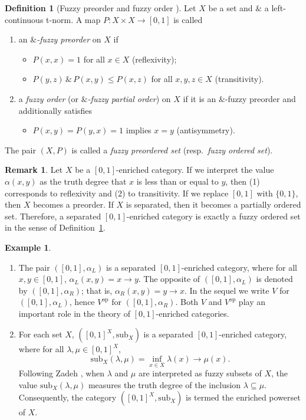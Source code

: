 \documentclass[preprint,3p,times]{elsarticle}
\theoremstyle{plain}
\theoremstyle{definition}
\newtheorem{definition}[thm]{Definition}
\newtheorem{exmp}[thm]{Example}
\newtheorem{remark}[thm]{Remark}
\numberwithin{equation}{section}
\begin{document}
\begin{definition}[Fuzzy preorder and fuzzy order \cite{HL2006}]\label{def:fuzzy-order}
Let $X$ be a set and $\&$ a left-continuous t-norm. A map $P \colon X \times X \to [0,1]$ is called
\begin{enumerate}[label=(\arabic*)]
    \item an \emph{$\&$-fuzzy preorder} on $X$ if
        \begin{itemize}
            \item[(i)] $P(x,x) = 1$ for all $x \in X$ \hfill (reflexivity);
            \item[(ii)] $P(y,z) \,\&\, P(x,y) \leq P(x,z)$ for all $x,y,z \in X$ \hfill (transitivity).
        \end{itemize}
    \item a \emph{fuzzy order} (or \emph{$\&$-fuzzy partial order}) on $X$ if it is an $\&$-fuzzy preorder 
        and additionally satisfies
        \begin{itemize}
            \item[(iii)] $P(x,y) = P(y,x) = 1$ implies $x = y$ \hfill (antisymmetry).
        \end{itemize}
\end{enumerate}
The pair $(X,P)$ is called a \emph{fuzzy preordered set} (resp.\ \emph{fuzzy ordered set}).
\end{definition}
\begin{remark}
Let \(X\) be a \([0,1]\)-enriched category. If we interpret the value \(\alpha(x,y)\) as the truth degree that \(x\) is less than or equal to \(y\), then (1) corresponds to reflexivity and (2) to transitivity. If we replace \([0,1]\) with \(\{0,1\}\), then \(X\) becomes a preorder. If \(X\) is separated, then it becomes a partially ordered set. Therefore, a separated \([0,1]\)-enriched category is exactly a fuzzy ordered set in the sense of Definition~\ref{def:fuzzy-order}.
\end{remark}
\begin{exmp}
\begin{enumerate} [label={\rm(\arabic*)}]
    \item The pair $([0,1], \alpha_L)$ is a separated \([0,1]\)-enriched category, where for all $x, y \in [0,1]$,
$\alpha_L(x, y) = x \to y$. The opposite of $([0,1], \alpha_L)$ is denoted by $([0,1], \alpha_R)$; that is, $\alpha_R(x, y) = y \to x$. In the sequel we write $V$ for $([0,1], \alpha_L)$, hence $V^\mathrm{op}$ for $([0,1], \alpha_R)$. Both $V$ and $V^\mathrm{op}$ play an important
role in the theory of \([0,1]\)-enriched categories.
    \item For each set $X$, $([0,1]^X, \text{sub}_X)$ is a separated \([0,1]\)-enriched category, where for all $\lambda, \mu \in [0,1]^X$,
  \[
  \text{sub}_X(\lambda, \mu) = \inf_{x \in X} \lambda(x) \to \mu(x).
  \]
Following Zadeh \cite{ZADEH1965338}, when $\lambda$ and $\mu$ are interpreted as fuzzy subsets of $X$, the value $\text{sub}_X(\lambda, \mu)$ measures the truth degree of the inclusion $\lambda \subseteq \mu$. Consequently, the category $([0,1]^X, \text{sub}_X)$ is termed the enriched powerset of $X$.
\end{enumerate}
 
\end{exmp}
    
\end{document}
